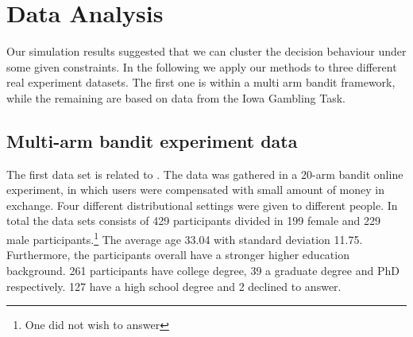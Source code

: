 \documentclass[12pt,a4paper,bibliography=totocnumbered,listof=totocnumbered]{scrartcl}
\begin{document}

\section{Data Analysis}

Our simulation results suggested that we can cluster the decision behaviour under some given constraints. In the following we apply our methods to three different real experiment datasets. The first one is within a multi arm bandit framework, while the remaining are based on data from the Iowa Gambling Task.

\subsection{Multi-arm bandit experiment data}

The first data set is related to \cite{Stojic2015}. The data was gathered in a 20-arm bandit online experiment, in which users were compensated with small amount of money in exchange. Four different distributional settings were given to different people. In total the data sets consists of 429 participants divided in 199 female and 229 male participants.\footnote{One did not wish to answer} The average age 33.04 with standard deviation 11.75. Furthermore, the participants overall have a stronger higher education background. 261 participants have college degree, 39 a graduate degree and PhD respectively. 127 have a high school degree and 2 declined to answer.\\
\end{document}
